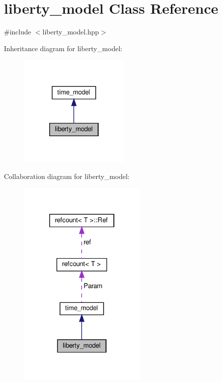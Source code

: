 \hypertarget{classliberty__model}{}\section{liberty\+\_\+model Class Reference}
\label{classliberty__model}


{\ttfamily \#include $<$liberty\+\_\+model.\+hpp$>$}



Inheritance diagram for liberty\+\_\+model\+:
\nopagebreak
\begin{figure}[H]
\begin{center}
\leavevmode
\includegraphics[width=154pt]{dc/dbd/classliberty__model__inherit__graph}
\end{center}
\end{figure}


Collaboration diagram for liberty\+\_\+model\+:
\nopagebreak
\begin{figure}[H]
\begin{center}
\leavevmode
\includegraphics[width=178pt]{d4/dcb/classliberty__model__coll__graph}
\end{center}
\end{figure}
